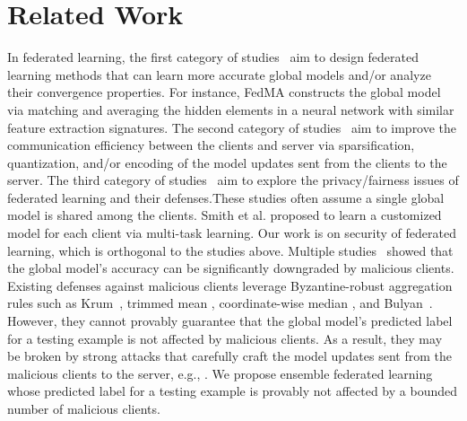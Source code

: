 \documentclass[letterpaper]{article} %
\begin{document}
\section{Related Work}
\vspace{-3.34mm}
In federated learning, the first category of studies~\cite{smith2017federated,li2019convergence,wang2020federated,liu2020federated,peng2019federated} aim to design  federated learning methods that can learn more accurate global models and/or analyze their convergence properties. For instance, FedMA \cite{wang2020federated} constructs the global model via matching and averaging the hidden elements in a neural network with similar feature extraction signatures. The second category of studies~\cite{konevcny2016federated,mcmahan2016communication,wen2017terngrad,alistarh2017qsgd,lee2017speeding,sahu2018convergence,bernstein2018signsgd,vogels2019powersgd,yurochkin2019bayesian,mohri2019agnostic,wang2020federated,li2020practical,li2020acceleration,hamer2020fedboost,rothchildfetchsgd,malinovsky2020local} aim to improve the communication efficiency between the clients and server via sparsification, quantization, and/or encoding of the model updates sent from the clients to the server. The third category of studies~\cite{bonawitz2017practical,geyer2017differentially,hitaj2017deep,melis2019exploiting,zhu2019deep,mohri2019agnostic,wang2020federatedlatent,Li2020Fair} aim to explore the privacy/fairness issues of federated learning and their defenses.These studies often assume a single global model is shared among the clients.  Smith et al. \cite{smith2017federated} proposed to learn a customized model for each client via multi-task learning.  Our work is on  security of federated learning, which is orthogonal to the studies above. Multiple studies~\cite{fang2019local,Bagdasaryan18,Xie19,Bhagoji19} showed that the  global model's accuracy can be significantly downgraded by malicious clients. Existing defenses against malicious clients leverage Byzantine-robust aggregation rules such as Krum~\cite{Blanchard17}, trimmed mean \cite{Yin18},  coordinate-wise median \cite{Yin18}, and Bulyan~\cite{Mhamdi18}. However, they cannot provably guarantee that the global model's predicted label for a testing example is not affected by malicious clients. As a result, they may be broken by strong attacks that carefully craft the model updates sent from the malicious clients to the server, e.g., \cite{fang2019local}. We propose ensemble federated learning whose predicted label for a testing example is provably not affected by a bounded number of malicious clients.
\end{document}
